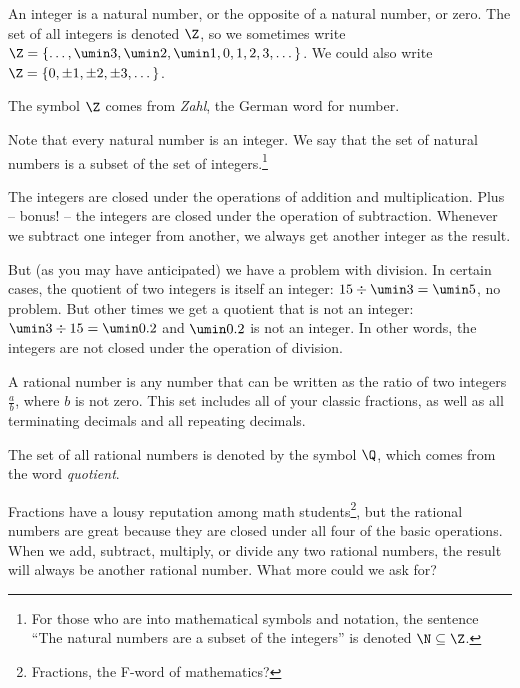 \begin{boxeddef}[Integer]
An \gls{integer} is a natural number, or the opposite of a natural number, or zero. The set of all integers is denoted $\Z$, so we sometimes write $\Z = \{\dotsc, \umin3, \umin2, \umin1, 0, 1, 2, 3, \dotsc \}$. We could also write $\Z = \{0, \pm1, \pm2, \pm3, \dotsc\}$.

The symbol $\Z$ comes from {\em Zahl}, the German word for number.
\end{boxeddef}

Note that every natural number is an integer. We say that the set of natural numbers is a \gls{subset} of the set of integers.\footnote{For those who are into mathematical symbols and notation, the sentence ``The natural numbers are a subset of the integers'' is denoted $\N \subseteq \Z$.}

The integers are closed under the operations of addition and multiplication. Plus -- bonus! -- the integers are closed under the operation of subtraction. Whenever we subtract one integer from another, we always get another integer as the result.

But (as you may have anticipated) we have a problem with division. In certain cases, the quotient of two integers is itself an integer: $15 \div \umin3 = \umin5$, no problem. But other times we get a quotient that is not an integer: $\umin3 \div 15 = \umin0.2$ and $\umin0.2$ is not an integer. In other words, the integers are not closed under the operation of division.

\begin{boxeddef}
\label{def:rationals}
A \gls{rational number} is any number that can be written as the ratio of two integers $\frac{a}{b}$, where $b$ is not zero. This set includes all of your classic fractions, as well as all terminating decimals and all repeating decimals.


The set of all rational numbers is denoted by the symbol $\Q$, which comes from the word {\em quotient}.
\end{boxeddef}

Fractions have a lousy reputation among math students\footnote{Fractions, the F-word of mathematics?}, but the rational numbers are great because they are closed under all four of the basic operations. When we add, subtract, multiply, or divide any two rational numbers, the result will always be another rational number. What more could we ask for?


